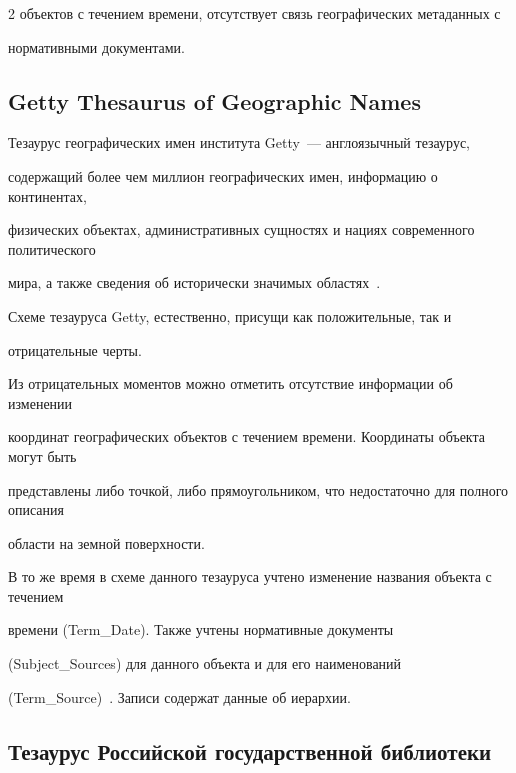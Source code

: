 \begin{multicols}{2}
объектов с течением времени, отсутствует связь географических метаданных с 

нормативными документами.



   \vspace*{-6pt}

  

  \subsection{{Getty Thesaurus of Geographic Names}}

  

  Тезаурус географических имен института {Getty}~--- англоязычный тезаурус, 

содержащий более чем миллион географических имен, информацию о континентах, 

физических объектах, административных сущностях и нациях современного политического 

мира, а также сведения об исторически значимых областях~\cite{7-sk}.

  

  Схеме тезауруса {Getty}, естественно, присущи как положительные, так и 

отрицательные черты.

  

  Из отрицательных моментов можно отметить отсутствие информации об изменении 

координат географических объектов с течением времени. Координаты объекта могут быть 

представлены либо точкой, либо прямоугольником, что недостаточно для полного описания 

области на земной поверхности.

  

  В то же время в схеме данного тезауруса учтено изменение названия объекта с течением 

времени ({Term\_Date}). Также учтены нормативные документы 

({Subject\_Sources}) для данного объекта и для его наименований 

({Term\_Source})~\cite{8-sk}. Записи содержат данные об иерархии.

  

  \subsection{Тезаурус Российской государственной библиотеки}


\end{multicols}
